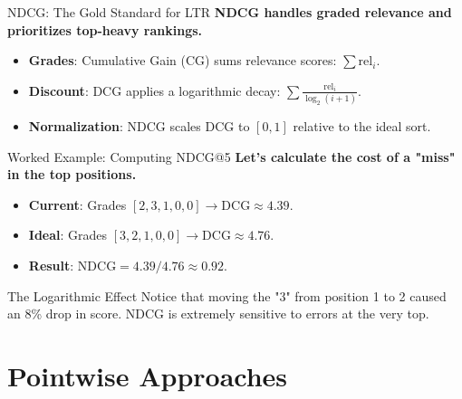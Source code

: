 \documentclass[aspectratio=169]{beamer}
\newif\ifanimated
\newcommand{\cpause}{\ifanimated\pause\fi}
\begin{document}
\begin{frame}{NDCG: The Gold Standard for LTR}
\textbf{NDCG handles graded relevance and prioritizes top-heavy rankings.}

\vspace{0.8em}
\begin{itemize}
    \item \textbf{Grades}: Cumulative Gain (CG) sums relevance scores: $\sum \text{rel}_i$.
    \item \textbf{Discount}: DCG applies a logarithmic decay: $\sum \frac{\text{rel}_i}{\log_2(i+1)}$.
    \item \textbf{Normalization}: NDCG scales DCG to $[0, 1]$ relative to the ideal sort.
\end{itemize}\cpause

\vspace{0.5em}
\cpause
\begin{center}
\end{center}
\end{frame}

\begin{frame}{Worked Example: Computing NDCG@5}
\textbf{Let's calculate the cost of a "miss" in the top positions.}

\vspace{0.8em}
\begin{itemize}
    \item \textbf{Current}: Grades $[2, 3, 1, 0, 0] \to \text{DCG} \approx 4.39$.
    \item \textbf{Ideal}: Grades $[3, 2, 1, 0, 0] \to \text{DCG} \approx 4.76$.
    \item \textbf{Result}: $\text{NDCG} = 4.39 / 4.76 \approx \mathbf{0.92}$.
\end{itemize}\cpause

\vspace{1em}
\cpause
\begin{exampleblock}{The Logarithmic Effect}
Notice that moving the "3" from position 1 to 2 caused an 8\% drop in score. NDCG is extremely sensitive to errors at the very top.
\end{exampleblock}
\end{frame}

\section{Pointwise Approaches}
\end{document}
